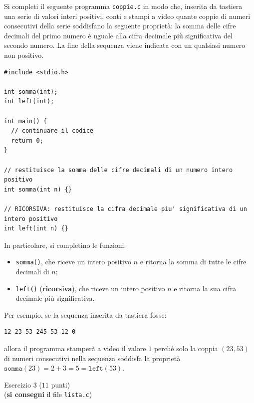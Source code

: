 \documentclass[12pt]{article}
\begin{document}
Si completi il seguente programma \texttt{coppie.c}
in modo che, inserita da tastiera
una serie di valori interi positivi,
conti e stampi a video quante coppie di numeri consecutivi della serie
soddisfano la seguente propriet\`a:
la somma delle cifre decimali del primo numero \`e uguale alla cifra
decimale pi\`u significativa del secondo numero. La fine della sequenza
viene indicata con un qualsiasi numero non positivo.
%
\begin{mdframed}[backgroundcolor=verylightgray]
  \begin{lstlisting}[language=myC]
#include <stdio.h>

int somma(int);
int left(int);

int main() {
  // continuare il codice
  return 0;
}

// restituisce la somma delle cifre decimali di un numero intero positivo
int somma(int n) {}

// RICORSIVA: restituisce la cifra decimale piu' significativa di un intero positivo
int left(int n) {}
  \end{lstlisting}
\end{mdframed}

In particolare, si completino le funzioni:
%
\begin{itemize}
\item \texttt{somma()}, che riceve un intero positivo $n$ e ritorna la somma di tutte
  le cifre decimali di $n$;
\item \texttt{left()} (\textbf{ricorsiva}), che riceve un intero positivo $n$
  e ritorna la sua cifra decimale pi\`u significativa.
\end{itemize}

Per esempio, se la sequenza inserita da tastiera fosse:
%
\begin{mdframed}[backgroundcolor=verylightgray]
\begin{verbatim}
12 23 53 245 53 12 0
\end{verbatim}
\end{mdframed}
%
allora il programma stamper\`a a video il valore $1$ perch\'e solo la coppia
$(23,53)$ di numeri consecutivi nella sequenza
soddisfa la propriet\`a $\texttt{somma}(23)=2+3=5=\texttt{left}(53)$.
%
\vspace*{1ex}
\begin{center}{\Large Esercizio 3} ($11$ punti)\\
  (\textbf{si consegni} il file \texttt{lista.c})
\end{center}
\end{document}
